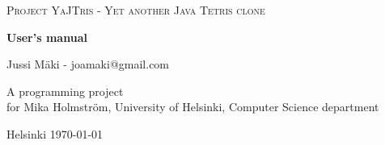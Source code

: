 \documentclass[11pt,a4paper]{article}
\begin{document}
\begin{titlepage}
  \begin{center} \sloppy
    \large \textsc{Project YaJTris - Yet another Java Tetris clone }
    \vfill

    \huge \textbf{User's manual} \vfill

    \LARGE Jussi Mäki - joamaki@gmail.com
    \vspace{3mm}

    A programming project\\
    for Mika Holmström, University of Helsinki, Computer Science department

    \vfill

    Helsinki \today

  \end{center}
\end{titlepage}

\thispagestyle{empty}

\tableofcontents

\newpage
\setcounter{page}{1}


\end{document}

